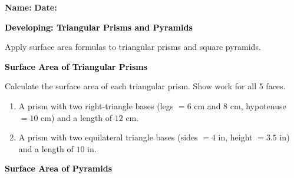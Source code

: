\documentclass[12pt, letterpaper, fleqn]{article}
\begin{document}
\textbf{Name:} \underline{\hspace{5cm}}
\hfill
\textbf{Date:} \underline{\hspace{3cm}}\\

\begin{tcolorbox}[colback=black!10]
    \large\textcolor{black}{\textbf{Developing: Triangular Prisms and Pyramids}}
\end{tcolorbox}

\vspace{3mm}

\noindent
Apply surface area formulas to triangular prisms and square pyramids.

\vspace{4mm}

\begin{tcolorbox}[colback=black!10]
\large\textcolor{black}{\textbf{Surface Area of Triangular Prisms}}
\end{tcolorbox}

\noindent
Calculate the surface area of each triangular prism. Show work for all 5 faces.

\vspace{3mm}

\begin{enumerate}[itemsep=2.2cm, leftmargin=0.6cm]

\item A prism with two right-triangle bases (legs $= 6\text{ cm}$ and $8\text{ cm}$, hypotenuse $= 10\text{ cm}$) and a length of $12\text{ cm}$.

\vspace{4cm}

\item A prism with two equilateral triangle bases (sides $= 4\text{ in}$, height $= 3.5\text{ in}$) and a length of $10\text{ in}$.

\vspace{2cm}

\end{enumerate}

\newpage

\begin{tcolorbox}[colback=black!10]
\large\textcolor{black}{\textbf{Surface Area of Pyramids}}
\end{tcolorbox}
\end{document}

